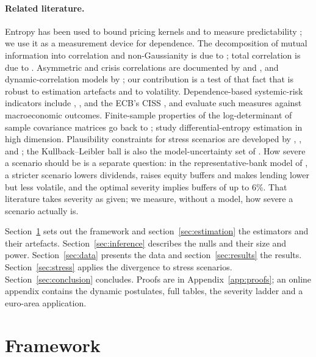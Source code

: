 \documentclass[12pt]{article}
\theoremstyle{definition}
\theoremstyle{remark}
\begin{document}
\begin{doublespace}
\paragraph{Related literature.} Entropy has been used to bound pricing
kernels \citep{stutzer1996,backus2014} and to measure predictability
\citep{maasoumi2002}; we use it as a measurement device for dependence. The
decomposition of mutual information into correlation and non-Gaussianity is
due to \citet{cardoso2003}; total correlation is due to
\citet{watanabe1960}. Asymmetric and crisis correlations are documented by
\citet{longin2001} and \citet{ang2002}, and dynamic-correlation models by
\citet{engle2002}; our contribution is a test of that fact that is robust to
estimation artefacts and to volatility. Dependence-based systemic-risk
indicators include \citet{kritzman2011}, \citet{billio2012},
\citet{diebold2014} and the ECB's CISS \citep{hollo2012}, and
\citet{giglio2016} evaluate such measures against macroeconomic outcomes.
Finite-sample properties of the log-determinant of sample covariance matrices
go back to \citet{bartlett1950}; \citet{cai2015} study differential-entropy
estimation in high dimension. Plausibility constraints for stress scenarios
are developed by \citet{breuer2009}, \citet{breuer2013},
\citet{glasserman2014} and \citet{glasserman2015}; the
Kullback--Leibler ball is also the model-uncertainty set of
\citet{hansen2008}.
How severe a scenario should be is a separate question: in the
representative-bank model of \citet{fischer2024}, a stricter scenario lowers
dividends, raises equity buffers and makes lending lower but less volatile,
and the optimal severity implies buffers of up to 6\%. That literature takes
severity as given; we measure, without a model, how severe a scenario actually
is.

Section~\ref{sec:framework} sets out the framework and
section~\ref{sec:estimation} the estimators and their artefacts.
Section~\ref{sec:inference} describes the nulls and their size and power.
Section~\ref{sec:data} presents the data and section~\ref{sec:results} the
results. Section~\ref{sec:stress} applies the divergence to stress scenarios.
Section~\ref{sec:conclusion} concludes. Proofs are in
Appendix~\ref{app:proofs}; an online appendix contains the dynamic
postulates, full tables, the severity ladder and a euro-area application.

\section{Framework}
\label{sec:framework}


\end{doublespace}
\end{document}
